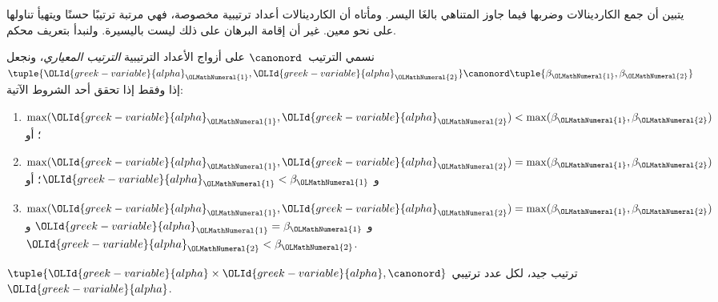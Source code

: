 \documentclass[../../../include/open-logic-section]{subfiles}
\begin{document}


يتبين أن جمع الكاردينالات وضربها فيما جاوز المتناهي بالغَا اليسر.
ومأتاه أن الكاردينالات أعداد ترتيبية مخصوصة، فهي مرتبة ترتيبًا حسنًا
ويتهيأ تناولها على نحو معين. غير أن إقامة البرهان على ذلك ليست باليسيرة.
ولنبدأ بتعريف محكم.

\begin{defn}
نسمي الترتيب~$\canonord$ على أزواج الأعداد الترتيبية
\emph{الترتيب المعياري}، ونجعل
$\tuple{{\OLId{greek-variable}{alpha}}_{\OLMathNumeral{1}}, {\OLId{greek-variable}{alpha}}_{\OLMathNumeral{2}}} \canonord
\tuple{\beta_{\OLMathNumeral{1}}, \beta_{\OLMathNumeral{2}}}$ إذا وفقط إذا تحقق أحد الشروط الآتية:
\begin{enumerate}
	\item $\max({\OLId{greek-variable}{alpha}}_{\OLMathNumeral{1}}, {\OLId{greek-variable}{alpha}}_{\OLMathNumeral{2}}) < \max(\beta_{\OLMathNumeral{1}}, \beta_{\OLMathNumeral{2}})$؛ أو
	\item $\max({\OLId{greek-variable}{alpha}}_{\OLMathNumeral{1}}, {\OLId{greek-variable}{alpha}}_{\OLMathNumeral{2}}) = \max(\beta_{\OLMathNumeral{1}}, \beta_{\OLMathNumeral{2}})$ و
	${\OLId{greek-variable}{alpha}}_{\OLMathNumeral{1}} < \beta_{\OLMathNumeral{1}}$؛ أو
	\item $\max({\OLId{greek-variable}{alpha}}_{\OLMathNumeral{1}}, {\OLId{greek-variable}{alpha}}_{\OLMathNumeral{2}}) = \max(\beta_{\OLMathNumeral{1}}, \beta_{\OLMathNumeral{2}})$ و
	${\OLId{greek-variable}{alpha}}_{\OLMathNumeral{1}} = \beta_{\OLMathNumeral{1}}$ و${\OLId{greek-variable}{alpha}}_{\OLMathNumeral{2}} < \beta_{\OLMathNumeral{2}}$.
\end{enumerate}
\end{defn}

\begin{lem}
$\tuple{{\OLId{greek-variable}{alpha}} \times {\OLId{greek-variable}{alpha}}, \canonord}$ ترتيب جيد، لكل عدد ترتيبي
${\OLId{greek-variable}{alpha}}$.
\end{lem}
\end{document}
